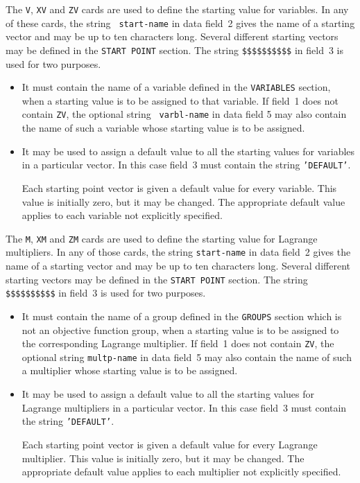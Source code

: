\documentclass[a4paper]{article}
\begin{document}
The {\tt  V}, {\tt  XV}  and  {\tt ZV} cards
are used to  define the
starting value for variables.  In any  of these cards, the string {\tt
start-name} in data field~2 gives the  name of a  starting  vector and
may be up to ten characters long.  Several different  starting vectors
may be defined in the {\tt START POINT}
section.  The string {\tt \$\$\$\$\$\$\$\$\$\$} in field~3 is used for
two purposes.

\begin{itemize}
\item
It must contain the name of a variable defined in the  {\tt VARIABLES}
section, when a starting value is to be assigned to that variable.  If
field~1 does  not   contain  {\tt    ZV}, the  optional string    {\tt
varbl-name}  in data field 5  may also  contain the  name  of  such a
variable whose starting value is to be assigned.

\item
It may be used  to assign a default  value to all  the starting values
for variables   in a  particular vector.  In  this  case  field~3 must
contain the string {\tt 'DEFAULT'}.

Each starting point   vector    is  given a  default
value  for  every
variable.  This value is initially  zero, but it may  be changed.  The
appropriate  default value applies  to each variable   not  explicitly
specified.
\end{itemize}

The   {\tt M}, {\tt  XM}  and {\tt ZM}   cards
are used  to define the starting value for Lagrange multipliers.
In any of those  cards, the
string {\tt start-name} in data field~2 gives the name of  a starting
vector  and  may be  up  to ten  characters  long.  Several  different
starting vectors may be defined in the {\tt START POINT} section.  The
string {\tt \$\$\$\$\$\$\$\$\$\$} in field~3 is used for two purposes.
\begin{itemize}
\item
It must contain the name of a group defined in the  {\tt GROUPS} section
which is not an objective function group,
when a starting  value is to
be assigned to the corresponding Lagrange multiplier.  If field~1 does
not contain {\tt ZV},  the optional string  {\tt multp-name} in  data
field~5 may also contain the name of such a multiplier  whose starting
value is to be assigned.

\item
It may be  used to assign  a default value to all  the starting values
for Lagrange multipliers in a particular vector.  In this case field~3
must contain the string {\tt 'DEFAULT'}.

Each starting point vector is given a default value for every Lagrange
multiplier.  This value is initially zero, but it may be changed.  The
appropriate default value applies  to  each multiplier not  explicitly
specified.
\end{itemize}
\end{document}
